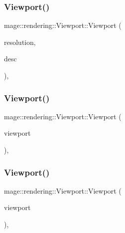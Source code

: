 \subsubsection{\texorpdfstring{Viewport()}{Viewport()}\hspace{0.1cm}{\footnotesize\ttfamily [3/7]}}
{\footnotesize\ttfamily mage\+::rendering\+::\+Viewport\+::\+Viewport (\begin{DoxyParamCaption}\item[{const \hyperlink{namespacemage_a88e05bff0300120c013285d3dcad95c5}{U32x2} \&}]{resolution,  }\item[{\hyperlink{namespacemage_1_1rendering_a25c189fd1da946d7a8f0abdd4f0e6afa}{A\+A\+Descriptor}}]{desc }\end{DoxyParamCaption})\hspace{0.3cm}{\ttfamily [explicit]}, {\ttfamily [noexcept]}}

\hypertarget{classmage_1_1rendering_1_1_viewport_a0fb086c9d200adabbd18dcd6ac11495d}{}\label{classmage_1_1rendering_1_1_viewport_a0fb086c9d200adabbd18dcd6ac11495d} 
\subsubsection{\texorpdfstring{Viewport()}{Viewport()}\hspace{0.1cm}{\footnotesize\ttfamily [4/7]}}
{\footnotesize\ttfamily mage\+::rendering\+::\+Viewport\+::\+Viewport (\begin{DoxyParamCaption}\item[{D3\+D11\+\_\+\+V\+I\+E\+W\+P\+O\+RT}]{viewport }\end{DoxyParamCaption})\hspace{0.3cm}{\ttfamily [explicit]}, {\ttfamily [noexcept]}}

\hypertarget{classmage_1_1rendering_1_1_viewport_ae5fe479caecadc9639d359c139517da6}{}\label{classmage_1_1rendering_1_1_viewport_ae5fe479caecadc9639d359c139517da6} 
\subsubsection{\texorpdfstring{Viewport()}{Viewport()}\hspace{0.1cm}{\footnotesize\ttfamily [5/7]}}
{\footnotesize\ttfamily mage\+::rendering\+::\+Viewport\+::\+Viewport (\begin{DoxyParamCaption}\item[{const \hyperlink{classmage_1_1rendering_1_1_viewport}{Viewport} \&}]{viewport }\end{DoxyParamCaption})\hspace{0.3cm}{\ttfamily [default]}, {\ttfamily [noexcept]}}

